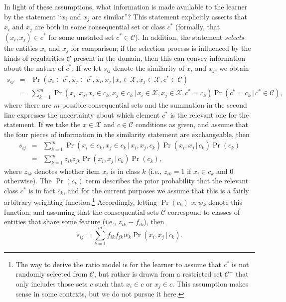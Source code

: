 \documentclass{apa}
\newcommand{\given}{\,|\,}
\begin{document}
In light of these assumptions, what information is made available to the learner by the statement ``$x_i$ and $x_j$ are similar''? This statement explicitly asserts that $x_i$ and $x_j$ are both in some consequential set or class $c^*$ (formally, that $(x_i, x_j) \in c^*$ for some unstated set $c^* \in \mathcal{C}$). In addition, the statement {\it selects} the entities $x_i$ and $x_j$ for comparison; if the selection process is influenced by the kinds of regularities $\mathcal{C}$ present in the domain, then this can convey information about the nature of $c^*$. If we let $s_{ij}$ denote the similarity of $x_i$ and $x_j$, we obtain
\begin{eqnarray}
s_{ij} &=& \Pr(x_i \in c^*,x_j \in c^*,x_i,x_j \given x_i \in \mathcal{X}, x_j \in \mathcal{X}, c^*\in \mathcal{C}) \\
&=& \sum_{k=1}^m \Pr(x_i, x_j, x_i \in c_k, x_j \in c_k \given x_i \in \mathcal{X}, x_j \in \mathcal{X}, c^* = c_k) \Pr(c^* = c_k \given c^* \in \mathcal{C}),
\end{eqnarray}
\noindent
where there are $m$ possible consequential sets and the summation in the second line expresses the uncertainty about which element $c^*$ is the relevant one for the statement. If we take the $x \in \mathcal{X}$ and $c\in \mathcal{C}$ conditions as given, and assume that the four pieces of information in the similarity statement are exchangeable, then
\begin{eqnarray}
s_{ij} &=& \sum_{k=1}^m \Pr(x_i\in c_k, x_j \in c_k \given x_i, x_j, c_k) \Pr(x_i,x_j \given c_k) \Pr(c_k) \\
&=& \sum_{k=1}^m z_{ik} z_{jk}  \Pr(x_i,x_j \given c_k)  \Pr(c_k),
\end{eqnarray}
\noindent
where $z_{ik}$ denotes whether item $x_i$ is in class $k$ (i.e., $z_{ik} = 1$ if $x_i \in c_k$ and 0 otherwise). The $\Pr(c_k)$ term describes the prior probability that the relevant class $c^*$ is in fact $c_k$, and for the current purposes we assume that this is a fairly arbitrary weighting function.\footnote{The way to derive the ratio model is for the learner to assume that $c^*$ is not randomly selected from $\mathcal{C}$, but rather is drawn from a restricted set $\mathcal{C}^-$ that only includes those sets $c$ such that $x_i \in c$ or $x_j \in c$. This assumption makes sense in some contexts, but we do not pursue it here.} Accordingly, letting $\Pr(c_k) \propto w_k$ denote this function, and assuming that the consequential sets $\mathcal{C}$ correspond to classes of entities that share some feature (i.e., $z_{ik} \equiv f_{ik}$), then
\begin{equation}
s_{ij} = \sum_{k=1}^{m} f_{ik} f_{jk} w_k \Pr(x_i, x_j \given c_k).
\end{equation}
\end{document}
